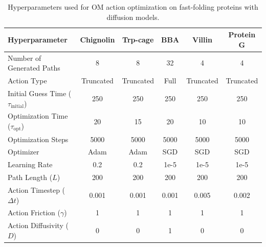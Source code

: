 \begin{table}[h]
\caption{Hyperparameters used for OM action optimization on fast-folding proteins with diffusion models.}
\label{tab:om_optimization_details_diffusion}
\scriptsize
\centering
\begin{tabular}{lccccc} %
    \toprule
    \textbf{Hyperparameter} & \textbf{Chignolin} & \textbf{Trp-cage} & \textbf{BBA} & \textbf{Villin} & \textbf{Protein G} \\
    \midrule
    Number of Generated Paths & 8 & 8 & 32 & 4 & 4 \\
        Action Type & Truncated & Truncated & Full & Truncated & Truncated \\
        Initial Guess Time ($\tau_\text{initial}$) & 250 & 250 & 250 & 250 & 250 \\
        Optimization Time ($\tau_\text{opt}$) & 20 & 15 & 20 & 10 & 10 \\
        Optimization Steps & 5000 & 5000 & 5000 & 5000 & 5000 \\
        Optimizer & Adam & Adam & SGD & SGD & SGD \\
        Learning Rate & 0.2 & 0.2 & 1e-5 & 1e-5 & 1e-5 \\
        Path Length ($L$) & 200 & 200 & 200 & 200 & 200 \\
        Action Timestep ($\Delta t$) & 0.001 & 0.001 & 0.001 & 0.005 & 0.002 \\
        Action Friction ($\gamma$) & 1 & 1 & 1 & 1 & 1 \\
        Action Diffusivity ($D$) & 0 & 0 & 1 & 0 & 0 \\
    \bottomrule
\end{tabular}
\end{table}

